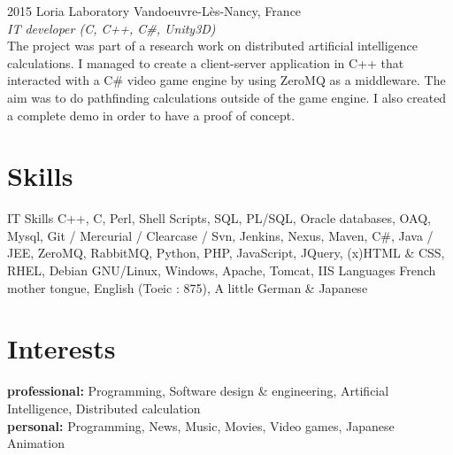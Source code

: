 \documentclass[]{friggeri-cv} %
\begin{document}
\begin{entrylist}

\entry
{2015}
{Loria Laboratory}
{Vandoeuvre-Lès-Nancy, France\\}
{ \emph {IT developer (C, C++, C\#, Unity3D)}\\
The project was part of a research work on distributed artificial intelligence calculations. I managed to create a client-server application in C++ that interacted with a C\# video game engine by using ZeroMQ as a middleware. The aim was to do pathfinding calculations outside of the game engine. I also created a complete demo in order to have a proof of concept. }


\end{entrylist}


\section{Skills}
\begin{entrylist}
\entry
{ }
{IT Skills}
{ }
{ C++, C, Perl, Shell Scripts, SQL, PL/SQL, Oracle databases, OAQ, Mysql, Git / Mercurial / Clearcase / Svn, Jenkins, Nexus, Maven, C\#, Java / JEE,  ZeroMQ, RabbitMQ, Python, PHP, JavaScript, JQuery, (x)HTML \& CSS, RHEL, Debian GNU/Linux, Windows, Apache, Tomcat, IIS }
\entry
{ }
{Languages}
{ }
{French mother tongue, English (Toeic : 875), A little German \& Japanese}
\end{entrylist}
\section{Interests}

\textbf{professional:} Programming, Software design \& engineering, Artificial Intelligence, Distributed calculation \\
\textbf{personal:} Programming, News, Music, Movies, Video games, Japanese Animation


\end{document}
